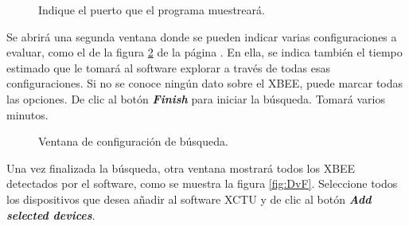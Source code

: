 \begin{figure}[H] %
\caption[1]{Indique el puerto que el programa muestreará.}
\label{fig:PS}
\end{figure}

Se abrirá una segunda ventana donde se pueden indicar varias configuraciones a evaluar, como el de la figura \ref{fig:PSe} de la página \pageref{fig:PSe}. En ella, se indica también el tiempo estimado que le tomará al software explorar a través de todas esas configuraciones. Si no se conoce ningún dato sobre el XBEE, puede marcar todas las opciones. De clic al botón \textit{\textbf{Finish}} para iniciar la búsqueda. Tomará varios minutos.

\begin{figure}[H] %
\caption[1]{Ventana de configuración de búsqueda.}
\label{fig:PSe}
\end{figure}

Una vez finalizada la búsqueda, otra ventana mostrará todos los XBEE detectados por el software, como se muestra la figura \ref{fig:DvF}. Seleccione todos los dispositivos que desea añadir al software XCTU y de clic al botón \textit{\textbf{Add selected devices}}.


